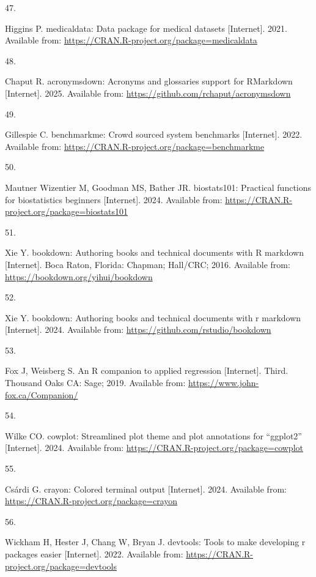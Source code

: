 \documentclass[
]{article}
\newlength{\cslhangindent}
\newlength{\csllabelwidth}
\newenvironment{CSLReferences}[2] %
 {\begin{list}{}{%
  \setlength{\itemindent}{0pt}
  \setlength{\leftmargin}{0pt}
  \setlength{\parsep}{0pt}
  \ifodd #1
   \setlength{\leftmargin}{\cslhangindent}
   \setlength{\itemindent}{-1\cslhangindent}
  \fi
  \setlength{\itemsep}{#2\baselineskip}}}
 {\end{list}}
\newcommand{\CSLLeftMargin}[1]{\parbox[t]{\csllabelwidth}{\strut#1\strut}}
\newcommand{\CSLRightInline}[1]{\parbox[t]{\linewidth - \csllabelwidth}{\strut#1\strut}}
\begin{document}
\begin{CSLReferences}{0}{1}
\CSLLeftMargin{47. }%
\CSLRightInline{Higgins P. {medicaldata}: Data package for medical datasets {[}Internet{]}. 2021. Available from: \url{https://CRAN.R-project.org/package=medicaldata}}

\CSLLeftMargin{48. }%
\CSLRightInline{Chaput R. {acronymsdown}: Acronyms and glossaries support for RMarkdown {[}Internet{]}. 2025. Available from: \url{https://github.com/rchaput/acronymsdown}}

\CSLLeftMargin{49. }%
\CSLRightInline{Gillespie C. {benchmarkme}: Crowd sourced system benchmarks {[}Internet{]}. 2022. Available from: \url{https://CRAN.R-project.org/package=benchmarkme}}

\CSLLeftMargin{50. }%
\CSLRightInline{Mautner Wizentier M, Goodman MS, Bather JR. biostats101: Practical functions for biostatistics beginners {[}Internet{]}. 2024. Available from: \url{https://CRAN.R-project.org/package=biostats101}}

\CSLLeftMargin{51. }%
\CSLRightInline{Xie Y. {bookdown}: Authoring books and technical documents with {R} markdown {[}Internet{]}. Boca Raton, Florida: Chapman; Hall/CRC; 2016. Available from: \url{https://bookdown.org/yihui/bookdown}}

\CSLLeftMargin{52. }%
\CSLRightInline{Xie Y. {bookdown}: Authoring books and technical documents with r markdown {[}Internet{]}. 2024. Available from: \url{https://github.com/rstudio/bookdown}}

\CSLLeftMargin{53. }%
\CSLRightInline{Fox J, Weisberg S. An {R} companion to applied regression {[}Internet{]}. Third. Thousand Oaks {CA}: Sage; 2019. Available from: \url{https://www.john-fox.ca/Companion/}}

\CSLLeftMargin{54. }%
\CSLRightInline{Wilke CO. {cowplot}: Streamlined plot theme and plot annotations for {``{ggplot2}''} {[}Internet{]}. 2024. Available from: \url{https://CRAN.R-project.org/package=cowplot}}

\CSLLeftMargin{55. }%
\CSLRightInline{Csárdi G. {crayon}: Colored terminal output {[}Internet{]}. 2024. Available from: \url{https://CRAN.R-project.org/package=crayon}}

\CSLLeftMargin{56. }%
\CSLRightInline{Wickham H, Hester J, Chang W, Bryan J. {devtools}: Tools to make developing r packages easier {[}Internet{]}. 2022. Available from: \url{https://CRAN.R-project.org/package=devtools}}


\end{CSLReferences}
\end{document}
